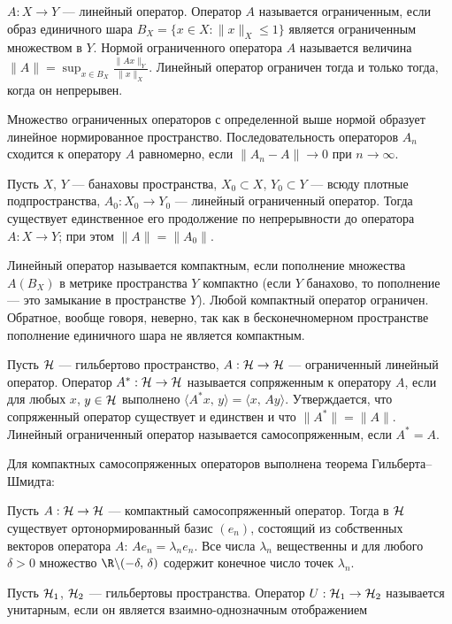 \documentclass[a4paper
]{article}
\begin{document}
$A:X\rightarrow Y$ --- линейный оператор. Оператор $A$ называется
ограниченным, если образ единичного шара $B_X=\{x\in X:\|x\|_X\le 1\}$
является ограниченным множеством в $Y$. Нормой ограниченного
оператора $A$ называется величина $\|A\|=\sup_{x\in B_X}\frac{\|Ax\|_Y}
{\|x\|_X}$. Линейный оператор ограничен тогда и только тогда,
когда он непрерывен. \par
Множество ограниченных операторов с определенной выше нормой образует
линейное нормированное пространство. Последовательность операторов
$A_n$ сходится к оператору $A$ равномерно, если $\|A_n-A\|\rightarrow 0$
при $n\rightarrow \infty$. \par
Пусть $X$, $Y$ --- банаховы пространства, $X_0\subset X$, $Y_0
\subset Y$ --- всюду плотные подпространства, $A_0:X_0\rightarrow
Y_0$ --- линейный ограниченный оператор. Тогда существует
единственное его продолжение по непрерывности до оператора
$A:X\rightarrow Y$; при этом $\|A\|=\|A_0\|$. \par
Линейный оператор называется компактным, если пополнение множества
$A(B_X)$ в метрике пространства $Y$ компактно (если $Y$ банахово,
то пополнение --- это замыкание в пространстве $Y$). Любой
компактный оператор ограничен. Обратное, вообще говоря, неверно,
так как в бесконечномерном пространстве пополнение единичного шара
не является компактным. \par
Пусть ${\cal H}$ --- гильбертово пространство, $A:{\cal H}\rightarrow
{\cal H}$ --- ограниченный линейный оператор. Оператор $A^*:{\cal H}
\rightarrow {\cal H}$ называется сопряженным к оператору $A$, если
для любых $x$, $y\in {\cal H}$ выполнено $\langle A^*x, \, y\rangle=
\langle x, \, Ay\rangle$. Утверждается, что сопряженный
оператор существует и единствен и что $\|A^*\|=\|A\|$. Линейный
ограниченный оператор называется самосопряженным, если $A^*=A$. \par
Для компактных самосопряженных операторов выполнена теорема
Гильберта--Шмидта:
\begin{Trm}
Пусть $A:{\cal H}\rightarrow {\cal H}$ --- компактный
самосопряженный оператор. Тогда в ${\cal H}$ существует ортонормированный
базис $(e_n)$, состоящий из собственных векторов оператора $A$:
$Ae_n=\lambda_ne_n$. Все числа $\lambda_n$ вещественны и для любого
$\delta>0$ множество $\R\backslash (-\delta, \, \delta)$ содержит
конечное число точек $\lambda_n$.
\end{Trm}
Пусть ${\cal H}_1$, ${\cal H}_2$ --- гильбертовы пространства.
Оператор $U:{\cal H}_1\rightarrow {\cal H}_2$ называется
унитарным, если он является взаимно-однозначным отображением
\end{document}
